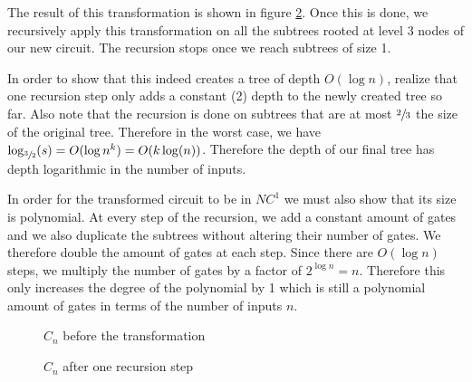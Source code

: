 \documentclass{article}
\begin{document}
The result of this transformation is shown in figure \ref{fig:transformed}. Once this is done, we recursively apply this transformation on all the subtrees rooted at level 3 nodes of our new circuit. The recursion stops once we reach subtrees of size 1.

In order to show that this indeed creates a tree of depth $O(\log n)$, realize that one recursion step only adds a constant (2) depth to the newly created tree so far. Also note that the recursion is done on subtrees that are at most $\sfrac{2}{3}$ the size of the original tree. Therefore in the worst case, we have $\log_{\sfrac{3}{2}}(s)=O(\log n^k)=O(k\log(n))$. Therefore the depth of our final tree has depth logarithmic in the number of inputs.

In order for the transformed circuit to be in $NC^1$ we must also show that its size is polynomial. At every step of the recursion, we add a constant amount of gates and we also duplicate the subtrees without altering their number of gates. We therefore double the amount of gates at each step. Since there are $O(\log n)$ steps, we multiply the number of gates by a factor of $2^{\log n}=n$. Therefore this only increases the degree of the polynomial by 1 which is still a polynomial amount of gates in terms of the number of inputs $n$.

\begin{figure}[H]
\centering
{}
\caption{$C_n$ before the transformation}
\label{fig:original}
\end{figure}

\begin{figure}[H]
\centering
{}
\caption{$C_n$ after one recursion step}
\label{fig:transformed}
\end{figure}
\end{document}
